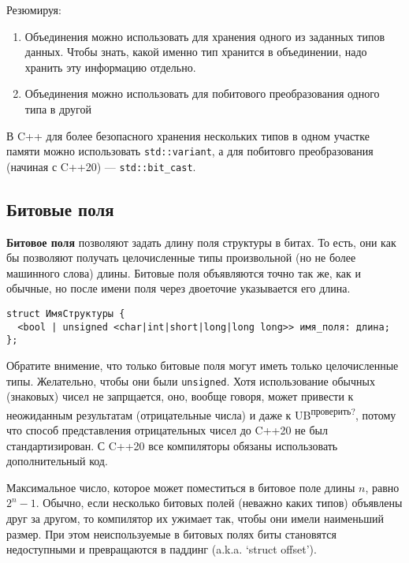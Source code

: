 Резюмируя:
\begin{enumerate}
  \item Объединения можно использовать для хранения одного из заданных типов данных. Чтобы знать,
  какой именно тип хранится в объединении, надо хранить эту информацию отдельно.
  \item Объединения можно использовать для побитового преобразования одного типа в другой
\end{enumerate}

{\small В C++ для более безопасного хранения нескольких типов в одном участке памяти можно использовать
\verb|std::variant|, а для побитовго преобразования (начиная с C++20) --- \verb|std::bit_cast|.}

\subsection{Битовые поля}
\textbf{Битовое поля} позволяют задать длину поля структуры в битах. %
То есть, они как бы позволяют получать целочисленные типы произвольной (но не
более машинного слова) длины. Битовые поля объявляются точно так же, как и обычные,
но после имени поля через двоеточие указывается его длина.
\begin{verbatim}
struct ИмяСтруктуры {
  <bool | unsigned <char|int|short|long|long long>> имя_поля: длина;
};
\end{verbatim}

Обратите внимение, что только битовые поля могут иметь только целочисленные типы.
{\small Желательно, чтобы они были \verb|unsigned|. Хотя использование обычных (знаковых)
чисел не запрщается, оно, вообще говоря, может привести к неожиданным результатам (отрицательные числа) и даже к UB\textsuperscript{проверить?},
потому что способ представления отрицательных чисел до C++20 не был стандартизирован.
С C++20 все компиляторы обязаны использовать дополнительный код.}

Максимальное число, которое может поместиться в битовое поле длины $n$, равно $2^n - 1$.
Обычно, если несколько битовых полей (неважно каких типов) объявлены друг за другом, то
компилятор их ужимает так, чтобы они имели наименьший размер. При этом неиспользуемые в
битовых полях биты становятся недоступными и превращаются в паддинг (a.k.a. `struct offset').

